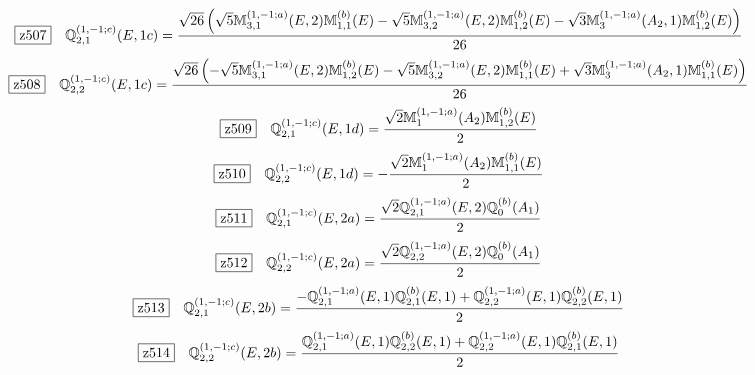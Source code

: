 \documentclass[fleqn,10pt,landscape]{jsarticle}
\begin{document}
\begin{dmath*}
\hspace*{3mm}\fbox{z507}\quad \mathbb{Q}_{2,1}^{(1,-1;c)}(E,1c)=\frac{\sqrt{26} \left(\sqrt{5} \mathbb{M}_{3,1}^{(1,-1;a)}(E,2) \mathbb{M}_{1,1}^{(b)}(E) - \sqrt{5} \mathbb{M}_{3,2}^{(1,-1;a)}(E,2) \mathbb{M}_{1,2}^{(b)}(E) - \sqrt{3} \mathbb{M}_{3}^{(1,-1;a)}(A_{2},1) \mathbb{M}_{1,2}^{(b)}(E)\right)}{26}
\end{dmath*}
\begin{dmath*}
\hspace*{3mm}\fbox{z508}\quad \mathbb{Q}_{2,2}^{(1,-1;c)}(E,1c)=\frac{\sqrt{26} \left(- \sqrt{5} \mathbb{M}_{3,1}^{(1,-1;a)}(E,2) \mathbb{M}_{1,2}^{(b)}(E) - \sqrt{5} \mathbb{M}_{3,2}^{(1,-1;a)}(E,2) \mathbb{M}_{1,1}^{(b)}(E) + \sqrt{3} \mathbb{M}_{3}^{(1,-1;a)}(A_{2},1) \mathbb{M}_{1,1}^{(b)}(E)\right)}{26}
\end{dmath*}
\begin{dmath*}
\hspace*{3mm}\fbox{z509}\quad \mathbb{Q}_{2,1}^{(1,-1;c)}(E,1d)=\frac{\sqrt{2} \mathbb{M}_{1}^{(1,-1;a)}(A_{2}) \mathbb{M}_{1,2}^{(b)}(E)}{2}
\end{dmath*}
\begin{dmath*}
\hspace*{3mm}\fbox{z510}\quad \mathbb{Q}_{2,2}^{(1,-1;c)}(E,1d)=- \frac{\sqrt{2} \mathbb{M}_{1}^{(1,-1;a)}(A_{2}) \mathbb{M}_{1,1}^{(b)}(E)}{2}
\end{dmath*}
\begin{dmath*}
\hspace*{3mm}\fbox{z511}\quad \mathbb{Q}_{2,1}^{(1,-1;c)}(E,2a)=\frac{\sqrt{2} \mathbb{Q}_{2,1}^{(1,-1;a)}(E,2) \mathbb{Q}_{0}^{(b)}(A_{1})}{2}
\end{dmath*}
\begin{dmath*}
\hspace*{3mm}\fbox{z512}\quad \mathbb{Q}_{2,2}^{(1,-1;c)}(E,2a)=\frac{\sqrt{2} \mathbb{Q}_{2,2}^{(1,-1;a)}(E,2) \mathbb{Q}_{0}^{(b)}(A_{1})}{2}
\end{dmath*}
\begin{dmath*}
\hspace*{3mm}\fbox{z513}\quad \mathbb{Q}_{2,1}^{(1,-1;c)}(E,2b)=\frac{- \mathbb{Q}_{2,1}^{(1,-1;a)}(E,1) \mathbb{Q}_{2,1}^{(b)}(E,1) + \mathbb{Q}_{2,2}^{(1,-1;a)}(E,1) \mathbb{Q}_{2,2}^{(b)}(E,1)}{2}
\end{dmath*}
\begin{dmath*}
\hspace*{3mm}\fbox{z514}\quad \mathbb{Q}_{2,2}^{(1,-1;c)}(E,2b)=\frac{\mathbb{Q}_{2,1}^{(1,-1;a)}(E,1) \mathbb{Q}_{2,2}^{(b)}(E,1) + \mathbb{Q}_{2,2}^{(1,-1;a)}(E,1) \mathbb{Q}_{2,1}^{(b)}(E,1)}{2}
\end{dmath*}
\end{document}

